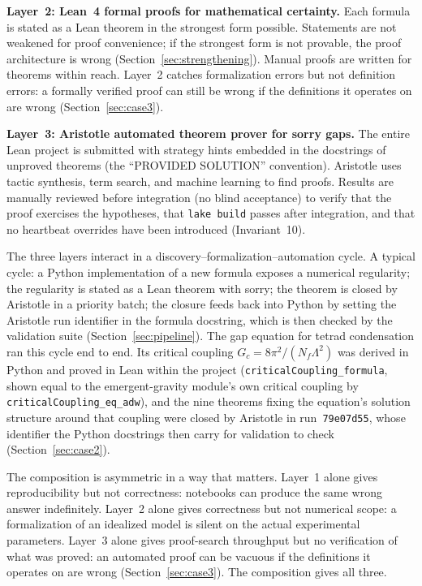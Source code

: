 \documentclass[11pt]{article}
\begin{document}
\textbf{Layer~2: Lean~4 formal proofs for mathematical certainty.}
Each formula is stated as a Lean theorem in the strongest form
possible. Statements are not weakened for proof convenience; if
the strongest form is not provable, the proof architecture is
wrong (Section~\ref{sec:strengthening}). Manual proofs are written
for theorems within reach. Layer~2 catches formalization errors
but not definition errors: a formally verified proof can still
be wrong if the definitions it operates on are wrong
(Section~\ref{sec:case3}).

\textbf{Layer~3: Aristotle automated theorem prover for sorry
gaps.} The entire Lean project is submitted with strategy hints
embedded in the docstrings of unproved theorems (the ``PROVIDED
SOLUTION'' convention). Aristotle uses tactic synthesis, term
search, and machine learning to find proofs. Results are
manually reviewed before integration (no blind acceptance)
to verify that the proof exercises the hypotheses, that
\texttt{lake build} passes after integration, and that no
heartbeat overrides have been introduced (Invariant~10).

The three layers interact in a discovery--formalization--automation
cycle. A typical cycle: a Python implementation of a new formula
exposes a numerical regularity; the regularity is stated as a Lean
theorem with sorry; the theorem is closed by Aristotle in a
priority batch; the closure feeds back into Python by setting the
Aristotle run identifier in the formula docstring, which is then
checked by the validation suite (Section~\ref{sec:pipeline}). The gap
equation for tetrad condensation ran this cycle end to end. Its
critical coupling $G_c = 8\pi^2/(N_f \Lambda^2)$ was derived in Python
and proved in Lean within the project
(\texttt{criticalCoupling\_formula}, shown equal to the
emergent-gravity module's own critical coupling by
\texttt{criticalCoupling\_eq\_adw}), and the nine theorems fixing the
equation's solution structure around that coupling were closed by
Aristotle in run~\texttt{79e07d55}, whose identifier the Python
docstrings then carry for validation to check
(Section~\ref{sec:case2}).

The composition is asymmetric in a way that matters. Layer~1 alone
gives reproducibility but not correctness: notebooks can produce
the same wrong answer indefinitely. Layer~2 alone gives correctness
but not numerical scope: a formalization of an idealized model is
silent on the actual experimental parameters.
Layer~3 alone gives proof-search throughput but no verification of
what was proved: an automated proof can be vacuous if the
definitions it operates on are wrong (Section~\ref{sec:case3}). The
composition gives all three.
\end{document}
